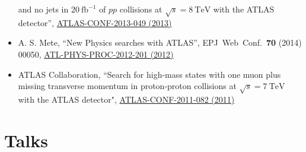 \documentclass[a4paper,10pt]{article}
\begin{document}
\begin{itemize}
	and no jets in $20\ \mathrm{fb}^{-1}$ of $pp$ collisions at $\sqrt{s} = 8\ \mathrm{TeV}$ with the ATLAS detector'',
	\href{https://atlas.web.cern.ch/Atlas/GROUPS/PHYSICS/CONFNOTES/ATLAS-CONF-2013-049/}{ATLAS-CONF-2013-049 (2013)}
	\item A. S. Mete,
	``New Physics searches with ATLAS'',
	EPJ\ Web\ Conf.\ {\bf 70} (2014) 00050,
	\href{https://cds.cern.ch/record/1478973}{ATL-PHYS-PROC-2012-201 (2012)}
	\item ATLAS Collaboration,
	``Search for high-mass states with one muon plus missing transverse momentum in proton-proton collisions at $\sqrt{s} = 7\ \mathrm{TeV}$ with the ATLAS detector",
	\href{https://atlas.web.cern.ch/Atlas/GROUPS/PHYSICS/CONFNOTES/ATLAS-CONF-2011-082/}{ATLAS-CONF-2011-082 (2011)}
\end{itemize}

\vspace{3mm}
\section{Talks}
\end{document}
